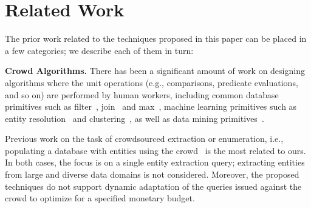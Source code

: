 

\section{Related Work}
\label{sec:related}
The prior work related to the techniques proposed in this paper can be placed in a few categories; we describe each of them in turn:

\vspace{3pt}\noindent\textbf{Crowd Algorithms.} There has been a significant amount of work on designing algorithms where the unit operations (e.g., comparisons, predicate evaluations, and so on) are performed by human workers, including common database primitives such as filter~\cite{crowdscreen}, join~\cite{markus-sorts-joins} and max~\cite{so-who-won},  machine learning primitives such as entity resolution~\cite{entity-matching, crowder} and clustering~\cite{crowdclustering}, as well as data mining primitives~\cite{amsterdamer:2013, get-another-label}. 

Previous work on the task of crowdsourced extraction or enumeration, i.e., populating a database with entities using the crowd~\cite{park:2014, trushkowsky:2013} is the most related to ours. In both cases, the focus is on a single entity extraction query; extracting entities from large and diverse data domains is not considered. Moreover, the proposed techniques do not support  dynamic adaptation of the queries issued against the crowd to optimize for a specified monetary budget. 


